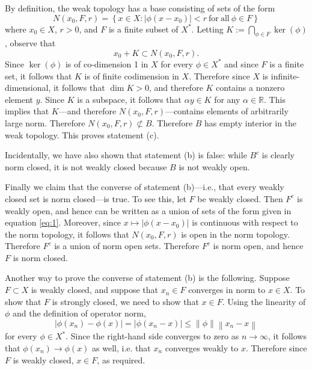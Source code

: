 \documentclass[answers]{exam}
\theoremstyle{problemstyle}
\newcommand{\norm}[1]{\left\lVert#1\right\rVert} %
\newcommand{\1}[1]{\textbf{1}_{\left[#1\right]}} %
\def\R{\mathbb{R}} %
\begin{document}
\begin{questions}
\begin{solution}
      By definition, the weak topology has a base consisting of sets of the form
    \begin{equation}\label{eq:1}
      N(x_{0},F,r)=\left\{ x\in X : |\phi(x-x_{0})|<r \mathrm{\ for\ all\ }\phi\in F\right\}
    \end{equation}
    where $x_{0}\in X$, $r>0$, and $F$ is a finite subset of $X^{*}$. Letting $K:= \bigcap_{\phi \in F} \ker(\phi)$, observe that
    \begin{equation*}
      x_{0}+ K \subset N(x_{0},F,r).
    \end{equation*}
    Since $\ker(\phi)$ is of co-dimension 1 in $X$ for every $\phi\in X^{*}$ and since $F$ is a finite set, it follows that $K$ is of finite codimension in $X$. Therefore since $X$ is infinite-dimensional, it follows that $\dim K >0$, and therefore $K$ contains a nonzero element $y$. Since $K$ is a subspace, it follows that $\alpha y\in K$ for any $\alpha\in \R$. This implies that $K$---and therefore $N(x_{0},F,r)$---contains elements of arbitrarily large norm. Therefore $N(x_{0},F,r)\not\subset B$. Therefore $B$ has empty interior in the weak topology. This proves statement (c).

    Incidentally, we have also shown that statement (b) is false: while $B^c$ is clearly norm closed, it is not weakly closed because $B$ is not weakly open.

    Finally we claim that the converse of statement (b)---i.e., that every weakly closed set is norm closed---is true. To see this, let $F$ be weakly closed. Then $F^c$ is weakly open, and hence can be written as a union of sets of the form given in equation \eqref{eq:1}. Moreover, since $x\mapsto |\phi(x-x_{0})|$ is continuous with respect to the norm topology, it follows that $N(x_{0},F,r)$ is open in the norm topology. Therefore $F^c$ is a union of norm open sets. Therefore $F^c$ is norm open, and hence $F$ is norm closed.

    Another way to prove the converse of statement (b) is the following. Suppose $F\subset X$ is weakly closed, and suppose that $x_{n}\in F$ converges in norm to $x\in X$. To show that $F$ is strongly closed, we need to show that $x\in F$. Using the linearity of $\phi$ and the definition of operator norm,
    \begin{equation*}
      |\phi(x_{n})-\phi(x)| = |\phi(x_{n}-x)|\leq \norm{\phi} \norm{x_{n}-x}
    \end{equation*}
    for every $\phi\in X^{*}$. Since the right-hand side converges to zero as $n\to\infty$, it follows that $\phi(x_{n})\to \phi(x)$ as well, i.e. that $x_{n}$ converges weakly to $x$. Therefore since $F$ is weakly closed, $x\in F$, as required.
\end{solution}



\end{questions}
\end{document}

